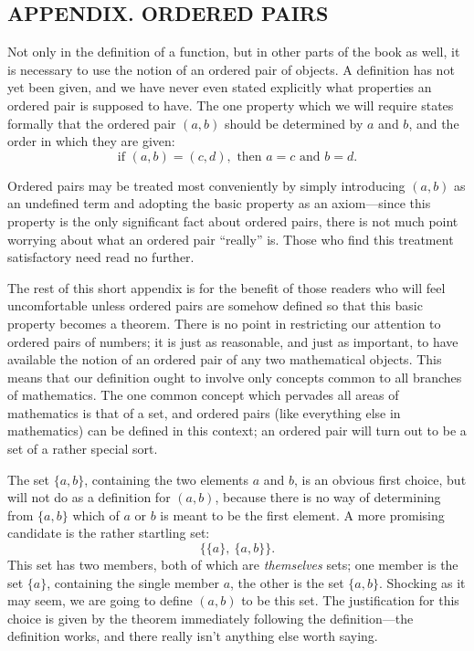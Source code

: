 \subsection*{APPENDIX. ORDERED PAIRS}

Not only in the definition of a function, but in other parts of the book as
well, it is necessary to use the notion of an ordered pair of objects. A
definition has not yet been given, and we have never even stated explicitly
what properties an ordered pair is supposed to have. The one property which
we will require states formally that the ordered pair $(a,b)$ should be
determined by $a$ and $b$, and the order in which they are given:
\[
\text{if }(a,b)=(c,d),\text{ then }a=c\text{ and }b=d.
\]

Ordered pairs may be treated most conveniently by simply introducing $(a,b)$
as an undefined term and adopting the basic property as an axiom---since this
property is the only significant fact about ordered pairs, there is not much
point worrying about what an ordered pair ``really'' is. Those who find this
treatment satisfactory need read no further.

The rest of this short appendix is for the benefit of those readers who will
feel uncomfortable unless ordered pairs are somehow defined so that this
basic property becomes a theorem. There is no point in restricting our
attention to ordered pairs of numbers; it is just as reasonable, and just as
important, to have available the notion of an ordered pair of any two
mathematical objects. This means that our definition ought to involve only
concepts common to all branches of mathematics. The one common concept which
pervades all areas of mathematics is that of a set, and ordered pairs (like
everything else in mathematics) can be defined in this context; an ordered
pair will turn out to be a set of a rather special sort.

The set $\{a,b\}$, containing the two elements $a$ and $b$, is an obvious
first choice, but will not do as a definition for $(a,b)$, because there is
no way of determining from $\{a,b\}$ which of $a$ or $b$ is meant to be the
first element. A more promising candidate is the rather startling set:
\[
\bigl\{\{a\},\ \{a,b\}\bigr\}.
\]
This set has two members, both of which are \emph{themselves} sets; one
member is the set $\{a\}$, containing the single member $a$, the other is the
set $\{a,b\}$. Shocking as it may seem, we are going to define $(a,b)$ to be
this set. The justification for this choice is given by the theorem
immediately following the definition---the definition works, and there really
isn't anything else worth saying.

